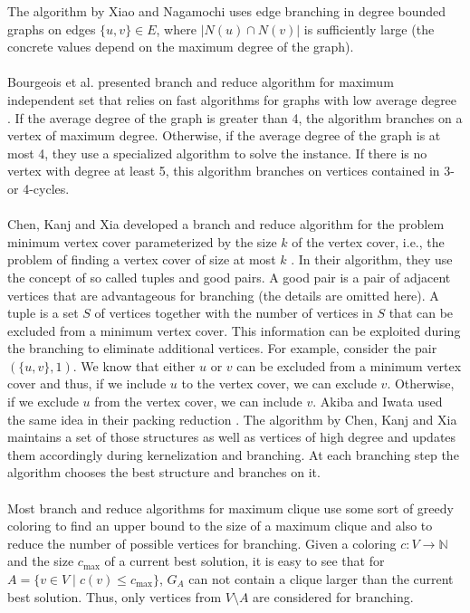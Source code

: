 \documentclass[]{article}
\begin{document}
The algorithm by Xiao and Nagamochi uses edge branching in degree bounded graphs on edges $\{u,v\}\in E$, where $|N(u)\cap N(v)|$ is sufficiently large (the concrete values depend on the maximum degree of the graph). \paragraph{}
Bourgeois et al. presented branch and reduce algorithm for maximum independent set that relies on fast algorithms for graphs with low average degree \cite{Bourgeois}. If the average degree of the graph is greater than 4, the algorithm branches on a vertex of maximum degree. Otherwise, if the average degree of the graph is at most 4, they use a specialized algorithm to solve the instance. If there is no vertex with degree at least 5, this algorithm branches on vertices contained in 3- or 4-cycles.\paragraph{}
Chen, Kanj and Xia developed a branch and reduce algorithm for the problem minimum vertex cover parameterized by the size $k$ of the vertex cover, i.e., the problem of finding a vertex cover of size at most $k$ \cite{ChenXiaKanj}. In their algorithm, they use the concept of so called tuples and good pairs. A good pair is a pair of adjacent vertices that are advantageous for branching (the details are omitted here). A tuple is a set $S$ of vertices together with the number of vertices in $S$ that can be excluded from a minimum vertex cover. This information can be exploited during the branching to eliminate additional vertices. For example, consider the pair $(\{u,v\}, 1)$. We know that either $u$ or $v$ can be excluded from a minimum vertex cover and thus, if we include $u$ to the vertex cover, we can exclude $v$. Otherwise, if we exclude $u$ from the vertex cover, we can include $v$. Akiba and Iwata used the same idea in their packing reduction \cite{AkibaIwata}. The algorithm by Chen, Kanj and Xia maintains a set of those structures as well as vertices of high degree and updates them accordingly during kernelization and branching. At each branching step the algorithm chooses the best structure and branches on it.\paragraph{}\newpage
Most branch and reduce algorithms for maximum clique use some sort of greedy coloring to find an upper bound to the size of a maximum clique and also to reduce the number of possible vertices for branching. Given a coloring $c:V \rightarrow \mathbb{N}$ and the size $c_\text{max}$ of a current best solution, it is easy to see that for $A = \{v\in V \;|\; c(v)\leq c_\text{max}\}$, $G_A$ can not contain a clique larger than the current best solution. Thus, only vertices from $V\setminus A$ are considered for branching.
\end{document}

